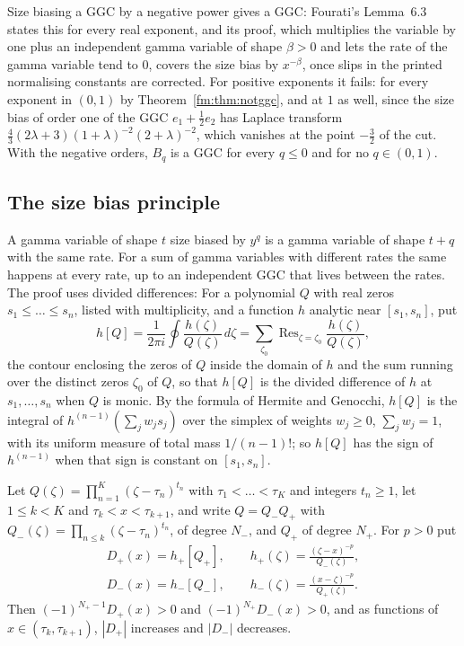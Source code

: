 Size biasing a GGC by a negative power gives a GGC: Fourati's Lemma~6.3 \cite{Fourati16} states this for every real exponent, and its proof, which multiplies the variable by one plus an independent gamma variable of shape $\beta>0$ and lets the rate of the gamma variable tend to $0$, covers the size bias by $x^{-\beta}$, once slips in the printed normalising constants are corrected. For positive exponents it fails: for every exponent in $(0,1)$ by Theorem~\ref{fm:thm:notggc}, and at $1$ as well, since the size bias of order one of the GGC $e_1+\frac12e_2$ has Laplace transform $\frac43(2\lambda+3)(1+\lambda)^{-2}(2+\lambda)^{-2}$, which vanishes at the point $-\frac32$ of the cut. With the negative orders, $B_q$ is a GGC for every $q\le0$ and for no $q\in(0,1)$.

\subsection{The size bias principle}\label{fm:sec:sbp}

A gamma variable of shape $t$ size biased by $y^q$ is a gamma variable of shape $t+q$ with the same rate. For a sum of gamma variables with different rates the same happens at every rate, up to an independent GGC that lives between the rates. The proof uses divided differences: For a polynomial $Q$ with real zeros $s_1\le\dots\le s_n$, listed with multiplicity, and a function $h$ analytic near $[s_1,s_n]$, put
\[
h[Q]=\frac1{2\pi i}\oint\frac{h(\zeta)}{Q(\zeta)}\,d\zeta=\sum_{\zeta_0}\operatorname{Res}_{\zeta=\zeta_0}\frac{h(\zeta)}{Q(\zeta)},
\]
the contour enclosing the zeros of $Q$ inside the domain of $h$ and the sum running over the distinct zeros $\zeta_0$ of $Q$, so that $h[Q]$ is the divided difference of $h$ at $s_1,\dots,s_n$ when $Q$ is monic. By the formula of Hermite and Genocchi, $h[Q]$ is the integral of $h^{(n-1)}(\sum_jw_js_j)$ over the simplex of weights $w_j\ge0$, $\sum_jw_j=1$, with its uniform measure of total mass $1/(n-1)!$; so $h[Q]$ has the sign of $h^{(n-1)}$ when that sign is constant on $[s_1,s_n]$.

\begin{lemma}\label{fm:lem:sign}
Let $Q(\zeta)=\prod_{n=1}^K(\zeta-\tau_n)^{t_n}$ with $\tau_1<\dots<\tau_K$ and integers $t_n\ge1$, let $1\le k<K$ and $\tau_k<x<\tau_{k+1}$, and write $Q=Q_-Q_+$ with $Q_-(\zeta)=\prod_{n\le k}(\zeta-\tau_n)^{t_n}$, of degree $N_-$, and $Q_+$ of degree $N_+$. For $p>0$ put
\begin{gather*}
D_+(x)=h_+[Q_+],\qquad h_+(\zeta)=\frac{(\zeta-x)^{-p}}{Q_-(\zeta)},\\
D_-(x)=h_-[Q_-],\qquad h_-(\zeta)=\frac{(x-\zeta)^{-p}}{Q_+(\zeta)} .
\end{gather*}
Then $(-1)^{N_+-1}D_+(x)>0$ and $(-1)^{N_+}D_-(x)>0$, and as functions of $x\in(\tau_k,\tau_{k+1})$, $|D_+|$ increases and $|D_-|$ decreases.
\end{lemma}

